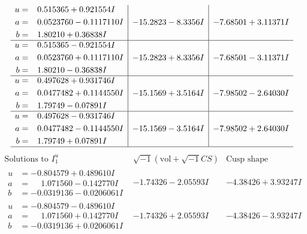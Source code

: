 \documentclass[1p]{elsarticle_modified}
\theoremstyle{definition}
\newcommand{\I}{\sqrt{-1}}
\begin{document}
$$\begin{array}{c|c|c}
\begin{aligned}
u &= \phantom{-}0.515365 + 0.921554 I \\
a &= \phantom{-}0.0523760 - 0.1117110 I \\
b &= \phantom{-}1.80210 + 0.36838 I\end{aligned}
 & -15.2823 - 8.3356 I & -7.68501 + 3.11371 I \\ \hline\begin{aligned}
u &= \phantom{-}0.515365 - 0.921554 I \\
a &= \phantom{-}0.0523760 + 0.1117110 I \\
b &= \phantom{-}1.80210 - 0.36838 I\end{aligned}
 & -15.2823 + 8.3356 I & -7.68501 - 3.11371 I \\ \hline\begin{aligned}
u &= \phantom{-}0.497628 + 0.931746 I \\
a &= \phantom{-}0.0477482 + 0.1144550 I \\
b &= \phantom{-}1.79749 - 0.07891 I\end{aligned}
 & -15.1569 + 3.5164 I & -7.98502 - 2.64030 I \\ \hline\begin{aligned}
u &= \phantom{-}0.497628 - 0.931746 I \\
a &= \phantom{-}0.0477482 - 0.1144550 I \\
b &= \phantom{-}1.79749 + 0.07891 I\end{aligned}
 & -15.1569 - 3.5164 I & -7.98502 + 2.64030 I\\
 \hline 
 \end{array}$$\newpage$$\begin{array}{c|c|c}  
\text{Solutions to }I^u_{1}& \I (\text{vol} + \sqrt{-1}CS) & \text{Cusp shape}\\
 \hline 
\begin{aligned}
u &= -0.804579 + 0.489610 I \\
a &= \phantom{-}1.071560 - 0.142770 I \\
b &= -0.0319136 - 0.0206061 I\end{aligned}
 & -1.74326 - 2.05593 I & -4.38426 + 3.93247 I \\ \hline\begin{aligned}
u &= -0.804579 - 0.489610 I \\
a &= \phantom{-}1.071560 + 0.142770 I \\
b &= -0.0319136 + 0.0206061 I\end{aligned}
 & -1.74326 + 2.05593 I & -4.38426 - 3.93247 I \\ \hline\begin{aligned}

\end{aligned}
\end{array}$$
\end{document}

